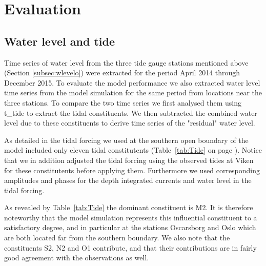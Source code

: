 \section{Evaluation}
\label{sec:evalu}
\subsection{Water level and tide}
\label{subsec:wlevele}
Time series of water level from the three tide gauge stations mentioned above (Section \ref{subsec:wlevelo}) were extracted for the period April 2014 through December 2015. To evaluate the model performance we also extracted water level time series from the model simulation for the same period from locations near the three stations. To compare the two time series we first analysed them using t\_tide \citep{pavlo:etal:2002} to extract the tidal constituents. We then subtracted the combined water level due to these constituents to derive time series of the "residual" water level. 

As detailed in \cite{roed:etal:2016} the tidal forcing we used at the southern open boundary of the model included only eleven tidal constitutents (Table~\ref{tab:Tide} on page \pageref{tab:Tide}). Notice that we in addition adjusted the tidal forcing using the observed tides at Viken for these constitutents before applying them. Furthermore we used corresponding amplitudes and phases for the depth integrated currents and water level in the tidal forcing. 

As revealed by Table~\ref{tab:Tide} the dominant constituent is M2. It is therefore noteworthy that the model simulation represents this influential constituent to a satisfactory degree, and in particular at the stations Oscarsborg and Oslo which are both located far from the southern boundary. We also note that the constituents S2, N2 and O1 contribute, and that their contributions are in fairly good agreement with the observations as well. 

